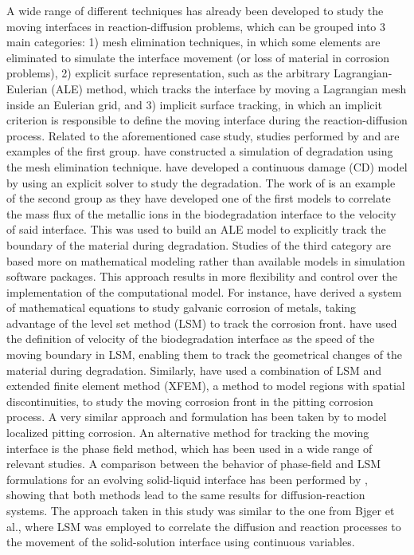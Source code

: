 A wide range of different techniques has already been developed to study the moving interfaces in reaction-diffusion problems, which can be grouped into 3 main categories: 1) mesh elimination techniques, in which some elements are eliminated to simulate the interface movement (or loss of material in corrosion problems), 2) explicit surface representation, such as the arbitrary Lagrangian-Eulerian (\gls{ALE}) method, which tracks the interface by moving a Lagrangian mesh inside an Eulerian grid, and 3) implicit surface tracking, in which an implicit criterion is responsible to define the moving interface during the reaction-diffusion process. Related to the aforementioned case study, studies performed by  \cite{Gao2018} and \cite{Gastaldi2011} are examples of the first group. \cite{Gao2018} have constructed a simulation of degradation using the mesh elimination technique. \cite{Gastaldi2011} have developed a continuous damage (\gls{CD}) model by using an explicit solver to study the degradation. The work of \cite{Grogan2014} is an example of the second group as they have developed one of the first models to correlate the mass flux of the metallic ions in the biodegradation interface to the velocity of said interface. This was used to build an ALE model to explicitly track the boundary of the material during degradation. Studies of the third category are based more on mathematical modeling rather than available models in simulation software packages. This approach results in more flexibility and control over the implementation of the computational model. For instance, \cite{Wilder2014} have derived a system of mathematical equations to study galvanic corrosion of metals, taking advantage of the level set method (\gls{LSM}) to track the corrosion front. \cite{Bajger2016} have used the definition of velocity of the biodegradation interface as the speed of the moving boundary in \gls{LSM}, enabling them to track the geometrical changes of the material during degradation. Similarly, \cite{Vagbharathi2014} have used a combination of \gls{LSM} and extended finite element method (XFEM), a method to model regions with spatial discontinuities, to study the moving corrosion front in the pitting corrosion process. A very similar approach and formulation has been taken by \cite{Duddu2014} to model localized pitting corrosion. An alternative method for tracking the moving interface is the phase field method, which has been used in a wide range of relevant studies. A comparison between the behavior of phase-field and \gls{LSM} formulations for an evolving solid-liquid interface has been performed by \cite{Xu2012}, showing that both methods lead to the same results for diffusion-reaction systems. The approach taken in this study was similar to the one from Bjger et al., where \gls{LSM} was employed to correlate the diffusion and reaction processes to the movement of the solid-solution interface using continuous variables.

